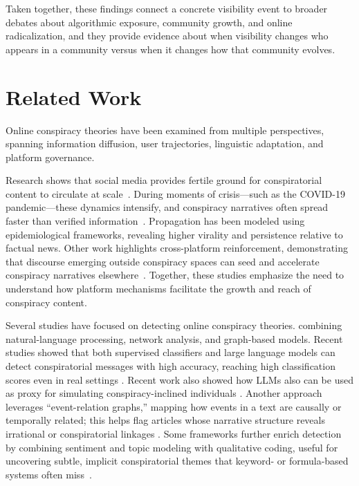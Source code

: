 \documentclass[letterpaper]{article} %
\begin{document}
Taken together, these findings connect a concrete visibility event to broader debates about algorithmic exposure, community growth, and online radicalization, and they provide evidence about when visibility changes who appears in a community versus when it changes how that community evolves.

\section{Related Work}
Online conspiracy theories have been examined from multiple perspectives, spanning information diffusion, user trajectories, linguistic adaptation, and platform governance.

Research shows that social media provides fertile ground for conspiratorial content to circulate at scale~\cite{bessi2015science}.
During moments of crisis---such as the COVID-19 pandemic---these dynamics intensify, and conspiracy narratives often spread faster than verified information~\cite{kauk2021understanding}.
Propagation has been modeled using epidemiological frameworks, revealing higher virality and persistence relative to factual news.
Other work highlights cross-platform reinforcement, demonstrating that discourse emerging outside conspiracy spaces can seed and accelerate conspiracy narratives elsewhere~\cite{paudel2021soros}.
Together, these studies emphasize the need to understand how platform mechanisms facilitate the growth and reach of conspiracy content.

Several studies have focused on detecting online conspiracy theories. 
combining natural-language processing, network analysis, and graph-based models. Recent studies showed that both supervised classifiers and large language models can detect conspiratorial messages with high accuracy, reaching high classification scores even in real settings \cite{pustet-etal-2024-detection,corso-etal-2025-conspiracy}. Recent work also showed how LLMs also can be used as proxy for simulating conspiracy-inclined individuals \cite{corso2025androids}. 
Another approach leverages ``event-relation graphs,'' mapping how events in a text are causally or temporally related; this helps flag articles whose narrative structure reveals irrational or conspiratorial linkages \cite{lei2023identifying}. 
Some frameworks further enrich detection by combining sentiment and topic modeling with qualitative coding, useful for uncovering subtle, implicit conspiratorial themes that keyword- or formula-based systems often miss~\cite{langguth2023coco}.
\end{document}
